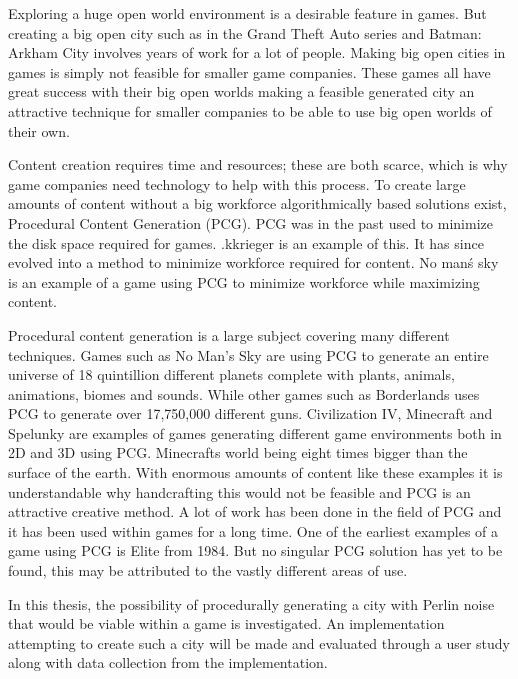Exploring a huge open world environment is a desirable feature in games. But creating a big open city such as in the Grand Theft Auto series and Batman: Arkham City involves years of work for a lot of people. Making big open cities in games is simply not feasible for smaller game companies. These games all have great success with their big open worlds making a feasible generated city an attractive technique for smaller companies to be able to use big open worlds of their own.
\par
Content creation requires time and resources; these are both scarce, which is why game companies need technology to help with this process. To create large amounts of content without a big workforce algorithmically based solutions exist, Procedural Content Generation (PCG). PCG was in the past used to minimize the disk space required for games. .kkrieger is an  example of this. It has since evolved into a method to minimize workforce required for content. No man\'s sky is an example of a game using PCG to minimize workforce while maximizing content.
\par
Procedural content generation is a large subject covering many different techniques. Games such as No Man's Sky\cite{NoMansSky} are using PCG to generate an entire universe of 18 quintillion\cite{NoMansSkyplanets} different planets complete with plants, animals, animations, biomes and sounds. While other games such as Borderlands\cite{Borderlands} uses PCG to generate over 17,750,000 different guns\cite{BorderlandsWeapons}. Civilization IV\cite{CivilizationCompany}, Minecraft\cite{Minecraft} and Spelunky\cite{Spelunky} are examples of games generating different game environments both in 2D and 3D using PCG. Minecrafts world being eight times bigger than the surface of the earth\cite{MinecraftSize}. With enormous amounts of content like these examples it is understandable why handcrafting this would not be feasible and PCG is an attractive creative method. A lot of work has been done in the field of PCG and it has been used within games for a long time. One of the earliest examples of a game using PCG is Elite\cite{Elite} from 1984. But no singular PCG solution has yet to be found, this may be attributed to the vastly different areas of use.
\par
In this thesis, the possibility of procedurally generating a city with Perlin noise that would be viable within a game is investigated. An implementation attempting to create such a city will be made and evaluated through a user study along with data collection from the implementation.
	
